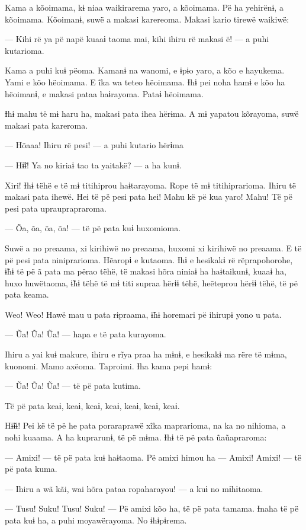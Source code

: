 Kama a kõoimama, kɨ niaa waikirarema yaro, a kõoimama. Pë ha yehirënɨ, a
kõoimama. Kõoimanɨ, suwë a makasi karereoma. Makasi kario tirewë
waikiwë:

--- Kihi rë ya pë napë kuaaɨ taoma mai, kihi ihiru rë makasi ë! --- a
puhi kutarioma. 

Kama a puhi kuɨ pëoma. Kamanɨ na wanomi, e ɨpɨo yaro, a kõo e hayukema.
Yami e kõo hëoimama. E ĩka wa teteo hëoimama. Ɨhɨ pei noha hamɨ e kõo ha
hëoimanɨ, e makasi pataa haɨrayoma. Pataɨ hëoimama. 

Ɨhɨ mahu të mɨ haru ha, makasi pata ihea hërɨma. A mɨ yapatou kõrayoma,
suwë makasi pata kareroma. 

--- Hõaaa! Ihiru rë pesi! --- a puhi kutario hërɨma 

--- Hɨ̃ɨ! Ya no kiriaɨ tao ta yaitakë? --- a ha kunɨ. 

Xiri! Ɨhɨ tëhë e të mɨ titihiprou haɨtarayoma. Rope të mɨ
titihiprarioma. Ihiru të makasi pata ihewë. Hei të pë pesi pata hei!
Mahu kë pë kua yaro! Mahu! Të pë pesi pata uprauprapraroma. 

--- Õa, õa, õa, õa! --- të pë pata kuɨ huxomioma. 

Suwë a no preaama, xi kirihiwë no preaama, huxomi xi kirihiwë no
preaama. E të pë pesi pata niniprarioma. Hẽaropɨ e kutaoma. Ɨhɨ e
hesikakɨ rë rëprapohorohe, ɨ̃hɨ të pë ã pata ma përao tëhë, të makasi
hõra niniaɨ ha haɨtaikunɨ, kuaaɨ ha, huxo huwëtaoma, ɨ̃hɨ tëhë të mɨ titi
supraa hërɨɨ tëhë, heẽteprou hërɨɨ tëhë, të pë pata keama. 

Weo! Weo! Hawë mau u pata rɨpraama, ɨ̃hɨ horemari pë ihirupɨ yono u
pata. 

--- Ũa! Ũa! Ũa! --- hapa e të pata kurayoma. 

Ihiru a yai kuɨ makure, ihiru e rĩya praa ha mɨnɨ, e hesikakɨ ma rëre të
mɨma, kuonomi. Mamo axëoma. Taproimi. Ɨha kama pepi hamɨ: 

--- Ũa! Ũa! Ũa! --- të pë pata kutima. 

Të pë pata keaɨ, keaɨ, keaɨ, keaɨ, keaɨ, keaɨ, keaɨ. 

Hɨ̃ɨɨ! Pei kë të pë he pata poraraprawë xĩka maprarioma, na ka no
nihioma, a nohi kuaama. A ha kuprarunɨ, të pë mɨma. Ɨhɨ të pë pata
ũaũapraroma: 

--- Amixi! --- të pë pata kuɨ haɨtaoma. Pë amixi himou ha --- Amixi!
Amixi! --- të pë pata kuma.

--- Ihiru a wã kãi, wai hõra pataa ropaharayou! --- a kuɨ no mɨhɨtaoma.

--- Tusu! Suku! Tusu! Suku! --- Pë amixi kõo ha, të pë pata tamama.
Ɨnaha të pë pata kuɨ ha, a puhi moyawërayoma. No ɨhɨpɨrema. 

